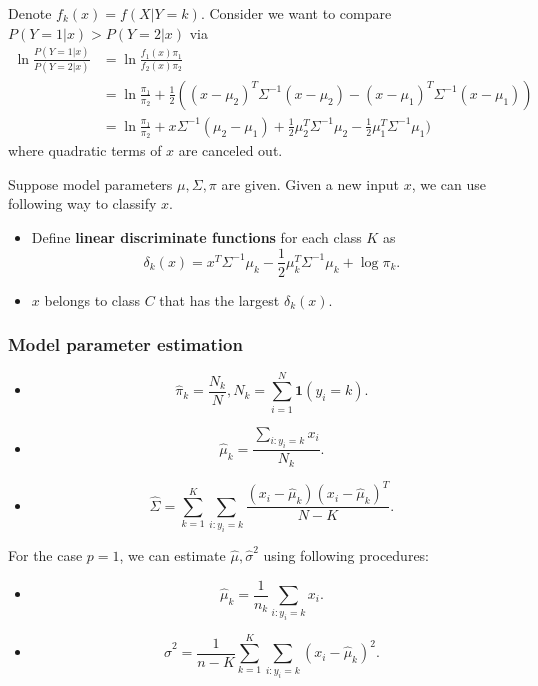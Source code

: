 \begin{refsection}
\begin{remark}
	Denote $f_k(x) = f(X|Y=k)$.	
	Consider we want to compare $P(Y=1|x) > P(Y=2|x)$ via
	\begin{align*}
	\ln \frac{P(Y=1|x)}{P(Y=2|x)} &= \ln \frac{f_1(x)\pi_1}{f_2(x)\pi_2}\\
	&= \ln \frac{\pi_1}{\pi_2} + \frac{1}{2}((x-\mu_2)^T\Sigma^{-1}(x-\mu_2) - (x-\mu_1)^T\Sigma^{-1}(x-\mu_1)) \\
	&= \ln \frac{\pi_1}{\pi_2} + x\Sigma^{-1}(\mu_2-\mu_1) + \frac{1}{2}\mu_2^T\Sigma^{-1}\mu_2 - \frac{1}{2}\mu_1^T\Sigma^{-1}\mu_1)
	\end{align*}
	where quadratic terms of $x$ are canceled out.
\end{remark}


\begin{method}
	Suppose model parameters $\mu, \Sigma, \pi$ are given. Given a new input $x$, we can use following way to classify $x$.
	\begin{itemize}
		\item Define \textbf{linear discriminate functions} for each class $K$ as
		$$\delta_k(x) = x^T\Sigma^{-1}\mu_k - \frac{1}{2}\mu_k^T\Sigma^{-1}\mu_k + \log \pi_k.$$
		\item $x$ belongs to class $C$ that has the largest $\delta_k(x)$. 
	\end{itemize}
\end{method}


\subsubsection{Model parameter estimation}


\begin{lemma}
	\begin{itemize}
		\item $$\hat{\pi}_k = \frac{N_k}{N}, N_k = \sum_{i=1}^N \bm{1}(y_i = k).$$
		\item $$\hat{\mu}_k = \frac{\sum_{i:y_i =k} x_i}{N_k}.$$
		\item $$\hat{\Sigma} = \sum_{k=1}^K\sum_{i:y_i=k}\frac{(x_i - \hat{\mu}_k)(x_i - \hat{\mu}_k)^T}{N-K}.$$
	\end{itemize}	
\end{lemma}




\begin{corollary}\cite[108]{murphy2012machine}
	For the case $p = 1$, we can estimate $\hat{\mu}, \hat{\sigma}^2$ using following procedures:
	\begin{itemize}
		\item $$\hat{\mu}_k = \frac{1}{n_k}\sum_{i:y_i =k} x_i.$$ 
		\item $$\hat{\sigma}^2 = \frac{1}{n-K}\sum_{k=1}^K \sum_{i:y_i =k} (x_i - \hat{\mu}_k)^2.$$ 
	\end{itemize}
\end{corollary}



\end{refsection}
